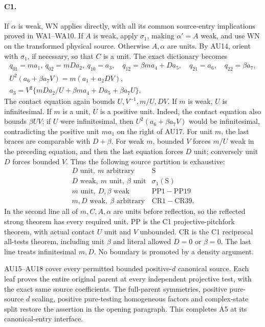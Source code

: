 \paragraph{C1.}
If \(\alpha\) is weak, WN applies directly, with all its common
source-entry implications proved in WA1--WA10.
If \(A\) is weak, apply \(\sigma_1\), making \(\alpha'=A\) weak,
and use WN on the transformed physical source.
Otherwise \(A,\alpha\) are units.
By AU14, orient with \(\sigma_1\), if necessary, so that \(C\)
is a unit. The exact dictionary becomes
\[
\begin{gathered}
 q_{01}=ma_1,\ q_{02}=mDa_2,\ q_{10}=a_3,\quad
 q_{12}=\beta ma_4+Da_5,\quad q_{21}=a_6,\quad q_{22}=\beta a_7,\\
 U^2(a_6+\beta a_7V)=m(a_1+a_2DV),\\
 a_3=V^2\{mDa_2/U+\beta ma_4+Da_5+\beta a_7U\}.
\end{gathered}\tag{AU17}
\]
The contact equation again bounds \(U,V^{-1},m/U,DV\).
If \(m\) is weak, \(U\) is infinitesimal.
If \(m\) is a unit, \(U\) is a positive unit.
Indeed, the contact equation also bounds \(\beta UV\); if
\(U\) were infinitesimal, then
\(U^2(a_6+\beta a_7V)\) would be infinitesimal, contradicting
the positive unit \(ma_1\) on the right of AU17.
For unit \(m\), the last braces are comparable with \(D+\beta\).
For weak \(m\), bounded \(V\) forces \(m/U\) weak in the
preceding equation, and then the last equation forces \(D\)
unit; conversely unit \(D\) forces bounded \(V\).
Thus the following source partition is exhaustive:
\[
\begin{array}{c|c}
 D\text{ unit},\ m\text{ arbitrary}&\mathrm S\\
 D\text{ weak},\ m\text{ unit},\ \beta\text{ unit}
       &\sigma_1(\mathrm S)\\
 m\text{ unit},\ D,\beta\text{ weak}
       &\mathrm{PP1\!-\!PP19}\\
 m,D\text{ weak},\ \beta\text{ arbitrary}
       &\mathrm{CR1\!-\!CR39}.
\end{array}\tag{AU18}
\]
In the second line all of \(m,C,A,\alpha\) are units before
reflection, so the reflected strong theorem has every required
unit. PP is the C1 projective-pitchfork theorem, with actual
contact \(U\) unit and \(V\) unbounded.
CR is the C1 reciprocal all-tests theorem, including unit
\(\beta\) and literal allowed \(D=0\) or \(\beta=0\).
The last line treats infinitesimal \(m,D\).
No boundary is promoted by a density argument.

AU15--AU18 cover every permitted bounded positive-\(d\) canonical
source. Each leaf proves the entire original parent at every
independent projective test, with the exact same source coefficients.
The full-parent symmetries, positive pure-source \(d\) scaling,
positive pure-testing homogeneous factors and complex-state split
restore the assertion in the opening paragraph. This completes
A5 at its canonical-entry interface.


